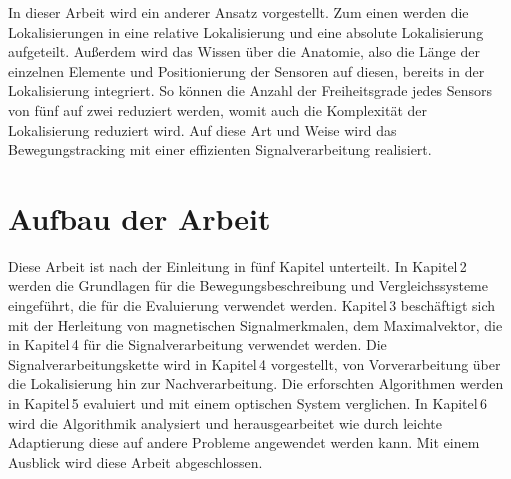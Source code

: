    In dieser Arbeit wird ein anderer Ansatz vorgestellt. Zum einen werden die Lokalisierungen in eine relative Lokalisierung und eine absolute Lokalisierung aufgeteilt. Außerdem wird das Wissen über die Anatomie, also die Länge der einzelnen Elemente und Positionierung der Sensoren auf diesen, bereits in der Lokalisierung integriert. So können die Anzahl der Freiheitsgrade jedes Sensors von fünf auf zwei reduziert werden, womit auch die Komplexität der Lokalisierung reduziert wird. Auf diese Art und Weise wird das Bewegungstracking mit einer effizienten Signalverarbeitung realisiert.


      
   \section{Aufbau der Arbeit}
   \label{sec:01_aufbau}
   Diese Arbeit ist nach der Einleitung in fünf Kapitel unterteilt. In Kapitel\,2 werden die Grundlagen für die Bewegungsbeschreibung und Vergleichssysteme eingeführt, die für die Evaluierung verwendet werden. Kapitel\,3 beschäftigt sich mit der Herleitung von magnetischen Signalmerkmalen, dem Maximalvektor, die in Kapitel\,4 für die Signalverarbeitung verwendet werden. Die Signalverarbeitungskette wird in Kapitel\,4 vorgestellt, von Vorverarbeitung über die Lokalisierung hin zur Nachverarbeitung. Die erforschten Algorithmen werden in Kapitel\,5 evaluiert und mit einem optischen System verglichen. In Kapitel\,6 wird die Algorithmik analysiert und herausgearbeitet wie durch leichte Adaptierung diese auf andere Probleme angewendet werden kann. Mit einem Ausblick wird diese Arbeit abgeschlossen.
